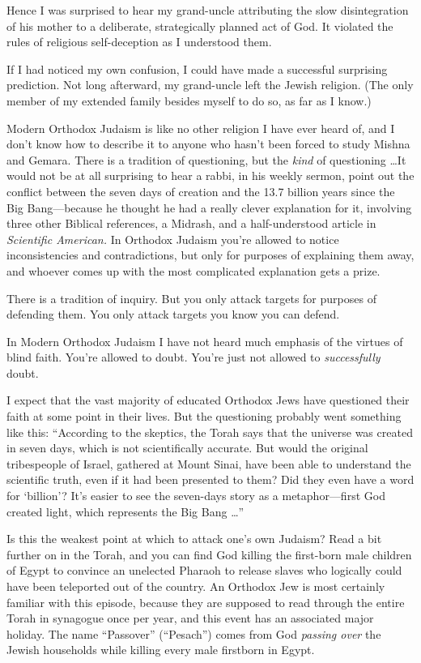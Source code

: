 {
 Hence I was surprised to hear my grand-uncle attributing the slow
disintegration of his mother to a deliberate, strategically planned act
of God. It violated the rules of religious self-deception as I
understood them.}

{
 If I had noticed my own confusion, I could have made a successful
surprising prediction. Not long afterward, my grand-uncle left the
Jewish religion. (The only member of my extended family besides myself
to do so, as far as I know.)}

{
 Modern Orthodox Judaism is like no other religion I have ever
heard of, and I don't know how to describe it to anyone
who hasn't been forced to study Mishna and Gemara.
There is a tradition of questioning, but the \textit{kind} of
questioning \ldots It would not be at all surprising to hear a rabbi, in
his weekly sermon, point out the conflict between the seven days of
creation and the 13.7 billion years since the Big Bang---because he
thought he had a really clever explanation for it, involving three
other Biblical references, a Midrash, and a half-understood article in
\textit{Scientific American.} In Orthodox Judaism
you're allowed to notice inconsistencies and
contradictions, but only for purposes of explaining them away, and
whoever comes up with the most complicated explanation gets a prize.}

{
 There is a tradition of inquiry. But you only attack targets for
purposes of defending them. You only attack targets you know you can
defend.}

{
 In Modern Orthodox Judaism I have not heard much emphasis of the
virtues of blind faith. You're allowed to doubt.
You're just not allowed to \textit{successfully}
doubt.}

{
 I expect that the vast majority of educated Orthodox Jews have
questioned their faith at some point in their lives. But the
questioning probably went something like this:
``According to the skeptics, the Torah says that the
universe was created in seven days, which is not scientifically
accurate. But would the original tribespeople of Israel, gathered at
Mount Sinai, have been able to understand the scientific truth, even if
it had been presented to them? Did they even have a word for
`billion'? It's easier
to see the seven-days story as a metaphor---first God created light,
which represents the Big Bang \ldots''}

{
 Is this the weakest point at which to attack one's
own Judaism? Read a bit further on in the Torah, and you can find God
killing the first-born male children of Egypt to convince an unelected
Pharaoh to release slaves who logically could have been teleported out
of the country. An Orthodox Jew is most certainly familiar with this
episode, because they are supposed to read through the entire Torah in
synagogue once per year, and this event has an associated major
holiday. The name ``Passover''
(``Pesach'') comes from God
\textit{passing over} the Jewish households while killing every male
firstborn in Egypt.}

